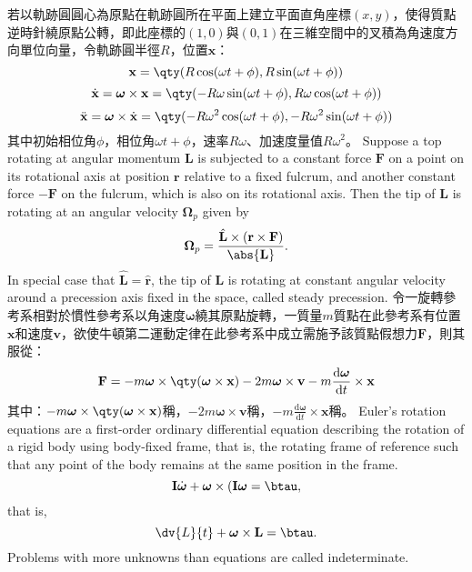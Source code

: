 \documentclass[a4paper,12pt]{article}
\begin{document}
若以軌跡圓圓心為原點在軌跡圓所在平面上建立平面直角座標$(x,y)$，使得質點逆時針繞原點公轉，即此座標的$(1,0)$與$(0,1)$在三維空間中的叉積為角速度方向單位向量，令軌跡圓半徑$R$，位置$\mathbf{x}$：
\[\mathbf{x}=\qty(R\cos(\omega t+\phi),R\sin(\omega t+\phi))\]
\[\dot{\mathbf{x}}=\boldsymbol{\omega}\times\mathbf{x}=\qty(-R\omega\sin(\omega t+\phi),R\omega\cos(\omega t+\phi))\]
\[\ddot{\mathbf{x}}=\boldsymbol{\omega}\times\dot{\mathbf{x}}=\qty(-R\omega^2\cos(\omega t+\phi),-R\omega^2\sin(\omega t+\phi))\]
其中初始相位角$\phi$，相位角$\omega t+\phi$，速率$R\omega$、加速度量值$R\omega^2$。 
Suppose a top rotating at angular momentum $\mathbf{L}$ is subjected to a constant force $\mathbf{F}$ on a point on its rotational axis at position $\mathbf{r}$ relative to a fixed fulcrum, and another constant force $-\mathbf{F}$ on the fulcrum, which is also on its rotational axis. Then the tip of $\mathbf{L}$ is rotating at an angular velocity $\boldsymbol{\Omega}_p$ given by
\[\boldsymbol{\Omega}_p=
\frac{\hat{\mathbf{L}}\times(\mathbf{r}\times\mathbf{F})}{\abs{\mathbf{L}}}.\]
In special case that $\hat{\mathbf{L}}=\hat{\mathbf{r}}$, the tip of $\mathbf{L}$ is rotating at constant angular velocity around a precession axis fixed in the space, called steady precession.
令一旋轉參考系相對於慣性參考系以角速度$\boldsymbol{\omega}$繞其原點旋轉，一質量$m$質點在此參考系有位置$\mathbf{x}$和速度$\mathbf{v}$，欲使牛頓第二運動定律在此參考系中成立需施予該質點假想力$\mathbf{F}$，則其服從：
\[\mathbf{F}=-m\boldsymbol{\omega}\times\qty(\boldsymbol{\omega}\times\mathbf{x})-2m\boldsymbol{\omega}\times\mathbf{v}-m\frac{\mathrm{d}\boldsymbol{\omega}}{\mathrm{d}t}\times\mathbf{x}\]
其中：$-m\boldsymbol{\omega}\times\qty(\boldsymbol{\omega}\times\mathbf{x})$稱，$-2m\boldsymbol{\omega}\times\mathbf{v}$稱，$-m\frac{\mathrm{d}\boldsymbol{\omega}}{\mathrm{d}t}\times\mathbf{x}$稱。
Euler's rotation equations are a first-order ordinary differential equation describing the rotation of a rigid body using body-fixed frame, that is, the rotating frame of reference such that any point of the body remains at the same position in the frame.
\[\mathbf{I}\dot{\boldsymbol{\omega}}+\boldsymbol{\omega}\times(\mathbf{I}\boldsymbol{\omega}=\btau,\]
that is,
\[\dv{L}{t}+\boldsymbol{\omega}\times\mathbf{L}=\btau.\]
Problems with more unknowns than equations are called indeterminate.
\end{document}
